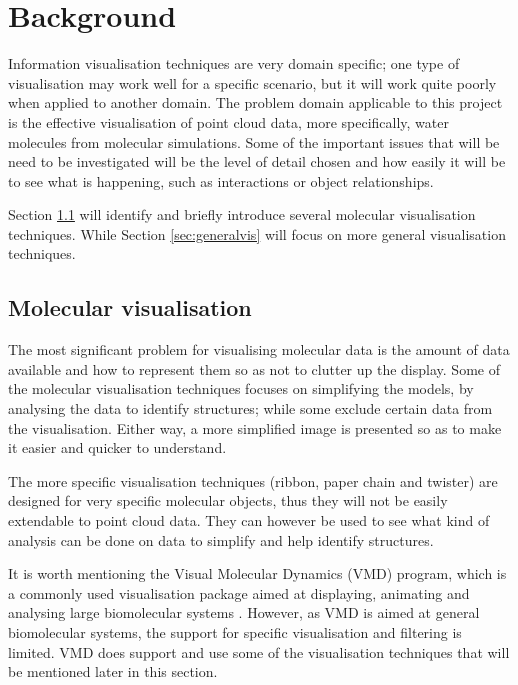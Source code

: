 \graphicspath{{./background/}}

\chapter{Background}
\label{chap:background}

Information visualisation techniques are very domain specific; one type of
visualisation may work well for a specific scenario, but it will work quite
poorly when applied to another domain. The problem domain applicable to this
project is the effective visualisation of point cloud data, more specifically,
water molecules from molecular simulations. Some of the important issues that
will be need to be investigated will be the level of detail chosen and how
easily it will be to see what is happening, such as interactions or object
relationships.

Section \ref{sec:molecularvis} will identify and briefly introduce several
molecular visualisation techniques. While Section \ref{sec:generalvis} will
focus on more general visualisation techniques.


\section{Molecular visualisation}
\label{sec:molecularvis}

The most significant problem for visualising molecular data is the amount of
data available and how to represent them so as not to clutter up the display.
Some of the molecular visualisation techniques focuses on simplifying the
models, by analysing the data to identify structures; while some exclude
certain data from the visualisation. Either way, a more simplified image is
presented so as to make it easier and quicker to understand.

The more specific visualisation techniques (ribbon, paper chain and twister) are
designed for very specific molecular objects, thus they will not be easily
extendable to point cloud data. They can however be used to see what kind of
analysis can be done on data to simplify and help identify structures.

It is worth mentioning the Visual Molecular Dynamics (VMD) \citep{humphrey96}
program, which is a commonly used visualisation package aimed at displaying,
animating and analysing large biomolecular systems \citep{VMD}. However, as VMD
is aimed at general biomolecular systems, the support for specific
visualisation and filtering is limited. VMD does support and use some of the
visualisation techniques that will be mentioned later in this section.

